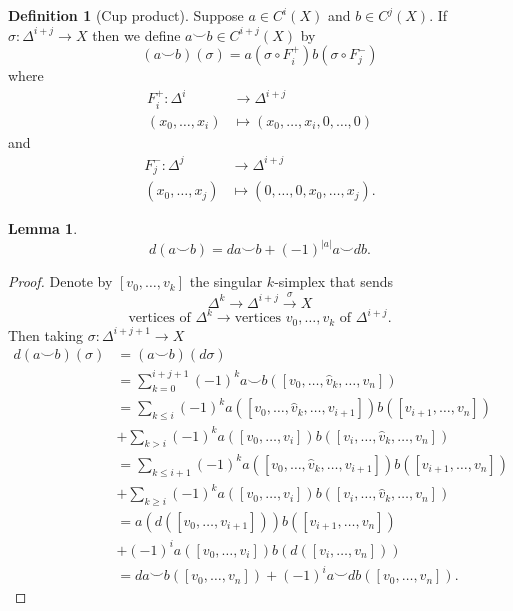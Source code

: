 \documentclass[10pt,]{book}
\newcommand{\gt}{>}
\theoremstyle{plain}
\newtheorem{lemma}[theorem]{Lemma}
\theoremstyle{definition}
\newtheorem{definition}[theorem]{Definition}
\numberwithin{equation}{section}
\begin{document}
\begin{definition}[Cup product]\label{definition-26}
Suppose \(a\in C^i(X)\) and \(b\in C^j(X)\).
            If \(\sigma\colon \Delta^{i+j} \to X\) then we define \(a\smile b\in C^{i+j}(X)\) by
            \[(a\smile b)(\sigma) = a(\sigma\circ F_i^+)b(\sigma\circ F_j^-)\]
            where
            \begin{align*}
F_i^+\colon \Delta^i &\to \Delta^{i+j}\\
(x_0,\ldots,x_i) &\mapsto (x_0,\ldots,x_i,0,\ldots,0)
\end{align*}
            and
            \begin{align*}
F_j^-\colon \Delta^j &\to \Delta^{i+j}\\
(x_0,\ldots,x_j) &\mapsto (0,\ldots,0,x_0,\ldots,x_j).
\end{align*}\end{definition}
\begin{lemma}\label{lemma-9}
\[d(a\smile b) = da\smile b + (-1)^{|a|} a\smile db.\]\end{lemma}
\begin{proof}
Denote by \([v_0,\ldots,v_k]\) the singular \(k\)-simplex that sends
            \[\Delta^k\to\Delta^{i+j}\xrightarrow{\sigma} X\]\[\text{vertices of }\Delta^k\to\text{vertices }v_0,\ldots,v_k\text{ of }\Delta^{i+j}.\]
            Then taking \(\sigma\colon \Delta^{i+j+1} \to X\)\begin{align*}
d(a\smile b)(\sigma) &=(a\smile b)(d\sigma)\\
&=\sum_{k=0}^{i+j+1}(-1)^k a\smile b([v_0,\ldots,\hat v_k,\ldots,v_n])\\
&=\sum_{k\le i}(-1)^k a([v_0,\ldots,\hat v_k,\ldots,v_{i+1}])b([v_{i+1},\ldots,v_n])\\
&+\sum_{k\gt i}(-1)^k a([v_0,\ldots,v_{i}])b([v_{i},\ldots,\hat v_k,\ldots,v_n])\\
&=\sum_{k\le i + 1}(-1)^k a([v_0,\ldots,\hat v_k,\ldots,v_{i+1}])b([v_{i+1},\ldots,v_n])\\
&+\sum_{k\ge i}(-1)^k a([v_0,\ldots,v_{i}])b([v_{i},\ldots,\hat v_k,\ldots,v_n])\\
&=a(d([v_0,\ldots,v_{i+1}]))b([v_{i+1},\ldots,v_n])\\
&+ (-1)^i a([v_0,\ldots,v_{i}])b(d([v_{i},\ldots,v_n]))\\
&= da\smile b([v_0,\ldots,v_n]) + (-1)^i a\smile db([v_0,\ldots,v_n]).
\end{align*}\end{proof}
%
\backmatter
%
\typeout{************************************************}
\typeout{************************************************}
\end{document}

